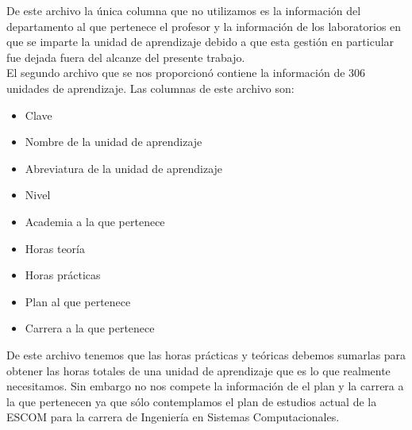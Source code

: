 De este archivo la única columna que no utilizamos es la información del departamento al que pertenece el profesor y la información de los laboratorios en que se imparte la unidad de aprendizaje debido a que esta gestión en particular fue dejada fuera del alcanze del presente trabajo.\\

El segundo archivo que se nos proporcionó contiene la información de 306 unidades de aprendizaje. Las columnas de este archivo son:

	\begin{itemize}
		\item Clave
		\item Nombre de la unidad de aprendizaje
		\item Abreviatura de la unidad de aprendizaje
		\item Nivel
		\item Academia a la que pertenece
		\item Horas teoría
		\item Horas prácticas
		\item Plan al que pertenece
		\item Carrera a la que pertenece
	\end{itemize}

De este archivo tenemos que las horas prácticas y teóricas debemos sumarlas para obtener las horas totales de una unidad de aprendizaje que es lo que realmente necesitamos. Sin embargo no nos compete la información de el plan y la carrera a la que pertenecen ya que sólo contemplamos el plan de estudios actual de la ESCOM para la carrera de Ingeniería en Sistemas Computacionales.\\
